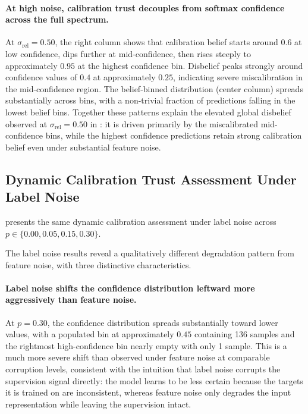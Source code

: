 \paragraph{At high noise, calibration trust decouples from softmax confidence 
across the full spectrum.} At $\sigma_{\text{rel}} = 0.50$, the right column shows that calibration belief starts around $0.6$ at low confidence, dips further at mid-confidence, then rises steeply to approximately $0.95$ at the highest confidence bin. Disbelief peaks strongly around confidence values of $0.4$ at approximately $0.25$, indicating severe miscalibration in the mid-confidence region. The belief-binned distribution (center column) spreads substantially across bins, with a non-trivial fraction of predictions falling in the lowest belief bins. Together these patterns explain the elevated global disbelief observed at $\sigma_{\text{rel}} = 0.50$ in : it is driven primarily by the miscalibrated mid-confidence bins, while the highest confidence predictions retain strong calibration belief even under 
substantial feature noise.



\subsection{Dynamic Calibration Trust Assessment Under Label Noise}

 presents the same dynamic calibration assessment under label noise across $p \in \{0.00, 0.05, 0.15, 0.30\}$.

The label noise results reveal a qualitatively different degradation pattern from feature noise, with three distinctive characteristics.

\paragraph{Label noise shifts the confidence distribution leftward more 
aggressively than feature noise.} At $p = 0.30$, the confidence distribution spreads substantially toward lower values, with a populated bin at approximately $0.45$ containing 136 samples and the rightmost high-confidence bin nearly empty with only 1 sample. This is a much more severe shift than observed under feature noise at comparable corruption levels, consistent with the intuition that label noise corrupts the supervision signal directly: the model learns to be less certain because the targets it is trained on are inconsistent, whereas feature noise only degrades the input representation while leaving the supervision intact.

